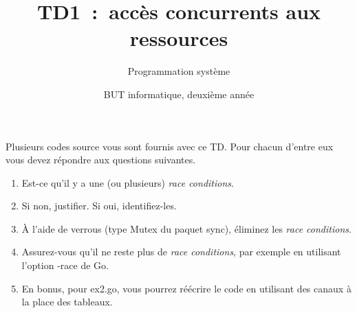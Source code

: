\documentclass[a4paper]{article}
\title{TD1~: accès concurrents aux ressources}
\author{Programmation système}
\date{BUT informatique, deuxième année}
\newcommand{\file}[1]{\textsf{#1}}
\newcommand{\inlinecode}[1]{\textsf{#1}}
\begin{document}
\maketitle{}

Plusieurs codes source vous sont fournis avec ce TD.
Pour chacun d'entre eux vous devez répondre aux questions suivantes.

\begin{enumerate}
\item Est-ce qu'il y a une (ou plusieurs) \emph{race conditions}.
\item Si non, justifier. Si oui, identifiez-les.
\item À l'aide de verrous (type \inlinecode{Mutex} du paquet \inlinecode{sync}), éliminez les \emph{race conditions}.
\item Assurez-vous qu'il ne reste plus de \emph{race conditions}, par exemple en utilisant l'option \inlinecode{-race} de Go.
\item En bonus, pour \file{ex2.go}, vous pourrez réécrire le code en utilisant des canaux à la place des tableaux.
\end{enumerate}
\end{document}

